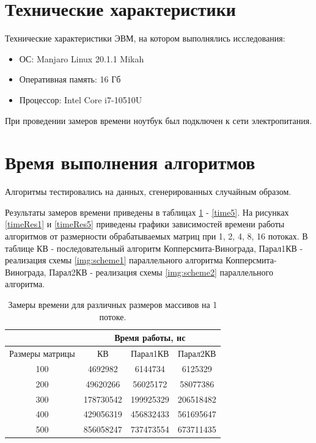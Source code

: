 \documentclass[12pt]{report}
\begin{document}
\newpage

\section{Технические характеристики}
Технические характеристики ЭВМ, на котором выполнялись исследования:
\begin{itemize}
\item ОС: Manjaro Linux 20.1.1 Mikah
\item Оперативная память: 16 Гб
\item Процессор: Intel Core i7-10510U
\end{itemize}


При проведении замеров времени ноутбук был подключен к сети электропитания.

\section{Время выполнения алгоритмов}
Алгоритмы тестировались на данных, сгенерированных случайным образом.

Результаты замеров времени приведены в таблицах \ref{time1} - \ref{time5}. На рисунках \ref{timeRes1} и \ref{timeRes5} приведены графики зависимостей времени работы алгоритмов от размерности обрабатываемых матриц при 1, 2, 4, 8, 16 потоках. В таблице КВ - последовательный алгоритм Копперсмита-Винограда, Парал1КВ - реализация схемы \ref{img:scheme1} параллельного алгоритма Копперсмита-Винограда, Парал2КВ - реализация схемы \ref{img:scheme2} параллельного алгоритма.

\newpage
\begin{table}[h]
	\begin{center}
		\caption{\label{time1} Замеры времени для различных размеров массивов на 1 потоке.}
		\begin{tabular}{|c |c |c |c|} 
 			\hline
 			&\multicolumn{3}{|c|}{Время работы, нс}\\
 			\hline
			Размеры матрицы & КВ & Парал1КВ & Парал2КВ \\ [0.5ex] 
 			\hline\hline
 			100 & 4692982 & 6144734 & 6125329 \\
 			\hline
 			200 & 49620266 & 56025172 & 58077386 \\
 			\hline
			300 & 178730542 & 199925329 & 206518482 \\
			\hline
			400 & 429056319 & 456832433 & 561695647 \\
			\hline
			500 & 856058247 & 737473554 & 673711435 \\
			\hline
			\end{tabular}
	\end{center}
\end{table}
\end{document}
